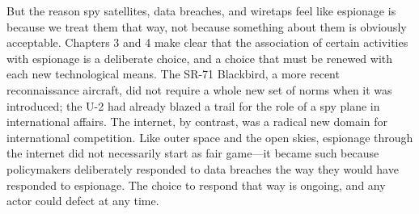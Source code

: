 \documentclass{memoir}
\begin{document}
But the reason spy satellites, data breaches, and wiretaps feel like espionage is because we treat them that way, not because something about them is obviously acceptable. Chapters 3 and 4 make clear that the association of certain activities with espionage is a deliberate choice, and a choice that must be renewed with each new technological means. The SR-71 Blackbird, a more recent reconnaissance aircraft, did not require a whole new set of norms when it was introduced; the U-2 had already blazed a trail for the role of a spy plane in international affairs. The internet, by contrast, was a radical new domain for international competition. Like outer space and the open skies, espionage through the internet did not necessarily start as fair game---it became such because policymakers deliberately responded to data breaches the way they would have responded to espionage. The choice to respond that way is ongoing, and any actor could defect at any time.


\end{document}
